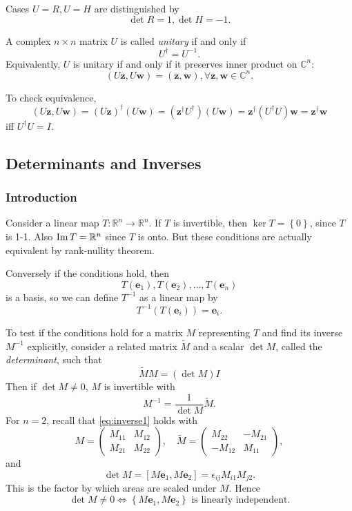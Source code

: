 \documentclass[a4paper]{article}
\begin{document}
    \begin{remark}
      Cases $ U=R, U=H $ are distinguished by
      \[
        \det R=1, \det H=-1
      .\]
    \end{remark}
    \begin{definition}
      A complex $n\times n$ matrix $U$ is called \textit{unitary} if and only if
      \[
        U^\dagger =U^{-1}
      .\]
      Equivalently, $U$ is unitary if and only if it preserves inner
      product on $ \mathbb{C}^{n} $:
      \[
        (U \mathbf{z}, U \mathbf{w})=(\mathbf{z},\mathbf{w}), \forall
        \mathbf{z},\mathbf{w}\in \mathbb{C}^{n}
      .\]
    \end{definition}
    To check equivalence,
    \[
      (U \mathbf{z}, U \mathbf{w})=(U \mathbf{z})^\dagger (U
      \mathbf{w})=(\mathbf{z}^\dagger U^\dagger )(U \mathbf{w}
      )=\mathbf{z}^\dagger (U^\dagger U)\mathbf{w}=\mathbf{z}^\dagger \mathbf{w}
    \]
    iff $ U^\dagger U=I $.
    \subsection{Determinants and Inverses}
    \subsubsection{Introduction}
    Consider a linear map $ T: \mathbb{R}^{n}\to \mathbb{R}^{n} $. If
    $T$ is invertible, then $ \ker T=\left\{ 0\right\} $, since $T$
    is 1-1. Also $ \operatorname{Im} T=\mathbb{R}^{n} $ since $T$ is onto. But
    these conditions are actually equivalent by rank-nullity theorem.

    Conversely if the conditions hold, then
    \[
      T(\mathbf{e}_1), T(\mathbf{e}_2),\dots,T(\mathbf{e}_n)
    \]
    is a basis, so we can define $ T^{-1} $ as a linear map by
    \[
      T^{-1}(T(\mathbf{e}_i))=\mathbf{e}_i
    .\]

    To test if the conditions hold for a matrix $M$ representing $T$
    and find its inverse $M^{-1}$ explicitly, consider a related
    matrix $ \tilde{M} $ and a scalar $ \det M $, called the
    \textit{determinant}, such that
    \begin{equation}\label{eq:inverse1}
      \tilde{M}M=(\det M)I
    \end{equation}
    Then if $ \det M\neq 0 $, $M$ is invertible with
    \[
      M^{-1}=\frac{1}{\det M}\tilde{M}
    .\]
    For $n=2$, recall that \ref{eq:inverse1} holds with
    \[
      M=
      \begin{pmatrix}
        M_{11}&M_{12}\\
        M_{21}&M_{22}
      \end{pmatrix},\quad \tilde{M}=
      \begin{pmatrix}
        M_{22}&-M_{21}\\
        -M_{12}&M_{11}
      \end{pmatrix},
    \]
    and
    \[
      \det M=[M \mathbf{e}_1, M\mathbf{e}_2]=\epsilon_{ij}M_{i1}M_{j2}
    .\]
    This is the factor by which areas are scaled under $M$. Hence
    \[
      \det M \neq 0 \Longleftrightarrow \left\{ M\mathbf{e}_1,
      M\mathbf{e}_2\right\}\text{ is linearly independent}
    .\]
\end{document}
